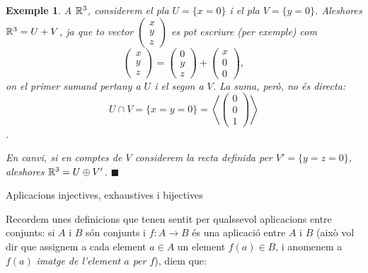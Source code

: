 \documentclass[
  11pt,
]{book}
\makeatletter
\numberwithin{dummy}{section}
\theoremstyle{maincolornumbox}
\theoremstyle{blacknumex}
\newtheorem{exampleT}{Exemple}[chapter]
\theoremstyle{blacknumbox}
\theoremstyle{maincolornum}
\newenvironment{example}{\begin{exampleT}}{\hfill{\tiny\ensuremath{\blacksquare}}\end{exampleT}}
\renewcommand{\section}{\@startsection{section}{1}{\z@}
{-4ex \@plus -1ex \@minus -.4ex}
{1ex \@plus.2ex }
{\normalfont\large\sffamily\bfseries}}
\makeatother
\begin{document}
\begin{example}
A \(\mathbb{R}^3\), considerem el pla \(U=\{x=0\}\) i el pla \(V=\{y = 0 \}\).
Aleshores \(\mathbb{R}^3 = U + V\), ja que to vector
\(\begin{pmatrix}x\\y\\z\end{pmatrix}\) es pot escriure (per exemple) com
\[\begin{pmatrix}
    x\\y\\z
    \end{pmatrix}=
    \begin{pmatrix}
    0\\y\\z
    \end{pmatrix}+
    \begin{pmatrix}
    x\\0\\0
    \end{pmatrix},\] on el primer sumand pertany a \(U\) i el segon a \(V\).
La suma, però, no és directa:
\[U\cap V=\{x=y=0\}=\left\langle \begin{pmatrix}0\\0\\1\end{pmatrix}\right\rangle\].

En canvi, si en comptes de \(V\) considerem la recta definida per
\(V'=\{y=z=0\}\), aleshores \(\mathbb{R}^3=U\oplus V'\).
\end{example}

\section{Aplicacions injectives, exhaustives i bijectives}\label{aplicacions-injectives-exhaustives-i-bijectives}

Recordem unes definicions que tenen sentit per qualssevol aplicacions
entre conjunts: si \(A\) i \(B\) són conjunts i \(f\colon A \to B\) és una
aplicació entre \(A\) i \(B\) (això vol dir que assignem a cada element
\(a\in A\) un element \(f(a)\in B\), i anomenem a \(f(a)\) \emph{imatge de
l'element \(a\) per \(f\)}), diem que:
\end{document}
